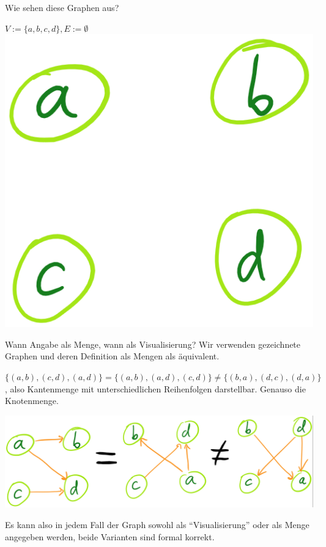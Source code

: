 \begin{frame}{Wie sehen diese Graphen aus?}
\begin{itemize}
		\pitem $V := \{a, b, c, d\}, E := \emptyset$\\
		\p\includegraphics[scale=0.17]{images/graph_0_03.png}
	\end{itemize}
\end{frame}

\begin{frame}{Wann Angabe als Menge, wann als Visualisierung?}
	Wir verwenden gezeichnete Graphen und deren Definition als Mengen als äquivalent.
	
	\begin{itemize}
		\pitem $\{(a,b),(c,d),(a,d)\} = \{(a,b),(a,d),(c,d)\} \neq \{(b,a),(d,c),(d,a)\}$, also Kantenmenge mit unterschiedlichen Reihenfolgen darstellbar. Genauso die Knotenmenge.
	\end{itemize}

	\ip
	\includegraphics[scale=.3]{images/graph_1.png}
	
	\bp
	
	Es kann also in jedem Fall der Graph sowohl als ``Visualisierung'' oder als Menge angegeben werden, beide Varianten sind formal korrekt.
\end{frame}

